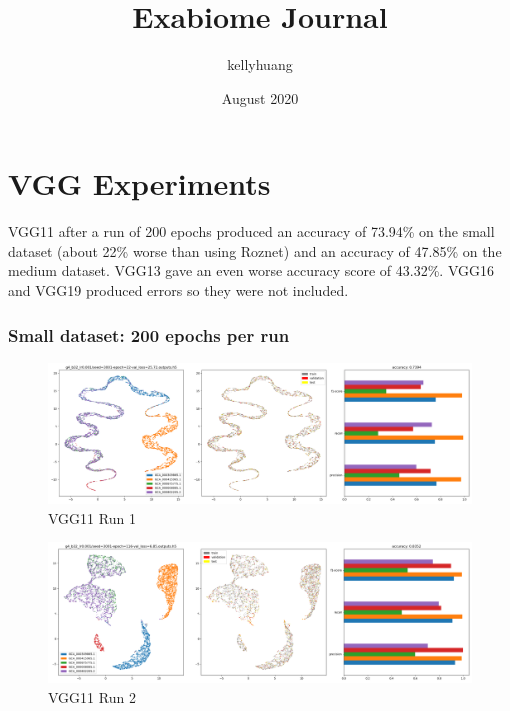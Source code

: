 \documentclass{article}
\title{Exabiome Journal}
\author{kellyhuang }
\date{August 2020}
\begin{document}
\maketitle

\section{VGG Experiments }
VGG11 after a run of 200 epochs produced an accuracy of 73.94\% on the small dataset (about 22\% worse than using Roznet) and an accuracy of 47.85\% on the medium dataset. VGG13 gave an even worse accuracy score of 43.32\%. VGG16 and VGG19 produced errors so they were not included. 


\subsubsection*{Small dataset: 200 epochs per run}
\begin{figure}[h!]
  \includegraphics[width=\linewidth]{new_journal/figures/experiments/vgg/small/vgg11/run1.png}
  \caption{VGG11 Run 1}
\end{figure}

\begin{figure}[h!]
  \includegraphics[width=\linewidth]{new_journal/figures/experiments/vgg/small/vgg11/run2.png}
  \caption{VGG11 Run 2}
\end{figure}

\clearpage
\end{document}
